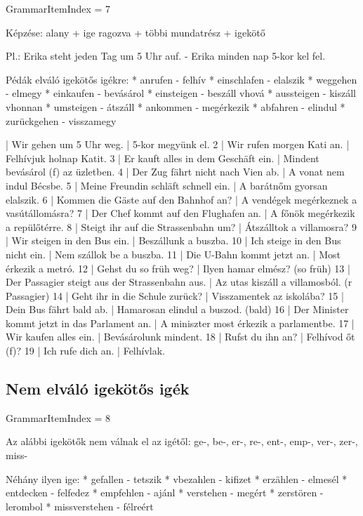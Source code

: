 \documentclass{article}
\newenvironment{desc}{\verbatim}{\endverbatim}
\newenvironment{exmp}{\verbatim}{\endverbatim}
\begin{document}
GrammarItemIndex = 7

\begin{desc}
Képzése: alany + ige ragozva + többi mundatrész + igekötő

Pl.: Erika steht jeden Tag um 5 Uhr auf. - Erika minden nap 5-kor kel fel.

Pédák elváló igekötős igékre:
* anrufen - felhív
* einschlafen - elalszik
* weggehen - elmegy
* einkaufen - bevásárol
* einsteigen - beszáll vhová
* aussteigen - kiszáll vhonnan
* umsteigen - átszáll
* ankommen - megérkezik
* abfahren - elindul
* zurückgehen - visszamegy
\end{desc}

\begin{exmp}
1 | Wir gehen um 5 Uhr weg. | 5-kor megyünk el.
2 | Wir rufen morgen Kati an. | Felhívjuk holnap Katit.
3 | Er kauft alles in dem Geschäft ein. | Mindent bevásárol (f) az üzletben.
4 | Der Zug fährt nicht nach Vien ab. | A vonat nem indul Bécsbe.
5 | Meine Freundin schläft schnell ein. | A barátnőm gyorsan elalszik.
6 | Kommen die Gäste auf den Bahnhof an? | A vendégek megérkeznek a vasútállomásra?
7 | Der Chef kommt auf den Flughafen an. | A főnök megérkezik a repülőtérre.
8 | Steigt ihr auf die Strassenbahn um? | Átszálltok a villamosra?
9 | Wir steigen in den Bus ein. | Beszállunk a buszba.
10 | Ich steige in den Bus nicht ein. | Nem szállok be a buszba.
11 | Die U-Bahn kommt jetzt an. | Most érkezik a metró.
12 | Gehst du so früh weg? | Ilyen hamar elmész? (so früh)
13 | Der Passagier steigt aus der Strassenbahn aus. | Az utas kiszáll a villamosból. (r Passagier)
14 | Geht ihr in die Schule zurück? | Visszamentek az iskolába?
15 | Dein Bus fährt bald ab. | Hamarosan elindul a buszod. (bald)
16 | Der Minister kommt jetzt in das Parlament an. | A miniszter most érkezik a parlamentbe.
17 | Wir kaufen alles ein. | Bevásárolunk mindent.
18 | Rufst du ihn an? | Felhívod őt (f)?
19 | Ich rufe dich an. | Felhívlak.
\end{exmp}

\subsection{Nem elváló igekötős igék}

GrammarItemIndex = 8

\begin{desc}
Az alábbi igekötők nem válnak el az igétől:
ge-, be-, er-, re-, ent-, emp-, ver-, zer-, miss-

Néhány ilyen ige:
* gefallen - tetszik
* vbezahlen - kifizet
* erzählen - elmesél
* entdecken - felfedez
* empfehlen - ajánl
* verstehen - megért
* zerstören - lerombol
* missverstehen - félreért
\end{desc}
\end{document}
